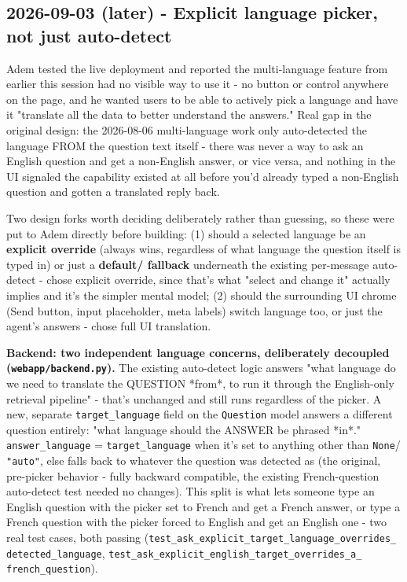 \subsection*{2026-09-03 (later) - Explicit language picker, not just auto-detect}
Adem tested the live deployment and reported the multi-language feature from earlier this session had no visible way to use it - no button or control anywhere on the page, and he wanted users to be able to actively pick a language and have it "translate all the data to better understand the answers." Real gap in the original design: the 2026-08-06 multi-language work only auto-detected the language FROM the question text itself - there was never a way to ask an English question and get a non-English answer, or vice versa, and nothing in the UI signaled the capability existed at all before you'd already typed a non-English question and gotten a translated reply back.

Two design forks worth deciding deliberately rather than guessing, so these were put to Adem directly before building: (1) should a selected language be an \textbf{explicit override} (always wins, regardless of what language the question itself is typed in) or just a \textbf{default/ fallback} underneath the existing per-message auto-detect - chose explicit override, since that's what "select and change it" actually implies and it's the simpler mental model; (2) should the surrounding UI chrome (Send button, input placeholder, meta labels) switch language too, or just the agent's answers - chose full UI translation.

\textbf{Backend: two independent language concerns, deliberately decoupled (\texttt{webapp/\allowbreak{}backend.py}).} The existing auto-detect logic answers "what language do we need to translate the QUESTION *from*, to run it through the English-only retrieval pipeline" - that's unchanged and still runs regardless of the picker. A new, separate \texttt{target\_\allowbreak{}language} field on the \texttt{Question} model answers a different question entirely: "what language should the ANSWER be phrased *in*." \texttt{answer\_\allowbreak{}language} = \texttt{target\_\allowbreak{}language} when it's set to anything other than \texttt{None}/ \texttt{"auto"}, else falls back to whatever the question was detected as (the original, pre-picker behavior - fully backward compatible, the existing French-question auto-detect test needed no changes). This split is what lets someone type an English question with the picker set to French and get a French answer, or type a French question with the picker forced to English and get an English one - two real test cases, both passing (\texttt{test\_\allowbreak{}ask\_\allowbreak{}explicit\_\allowbreak{}target\_\allowbreak{}language\_\allowbreak{}overrides\_\allowbreak{} detected\_\allowbreak{}language}, \texttt{test\_\allowbreak{}ask\_\allowbreak{}explicit\_\allowbreak{}english\_\allowbreak{}target\_\allowbreak{}overrides\_\allowbreak{}a\_\allowbreak{} french\_\allowbreak{}question}).

